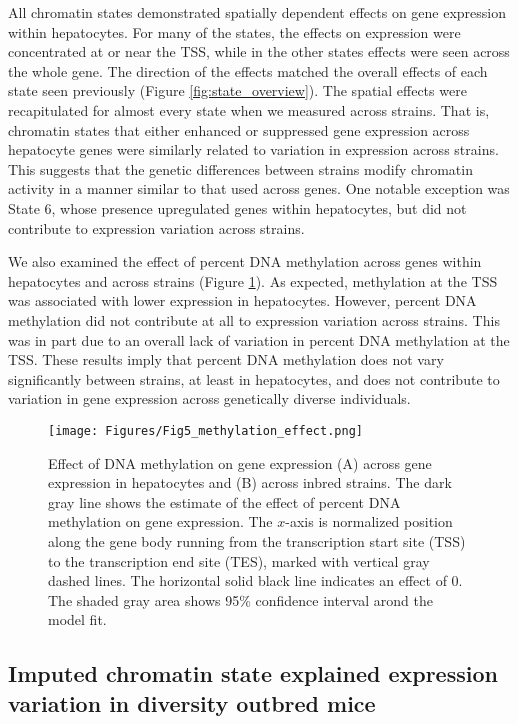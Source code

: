 \documentclass[
  11pt,
]{article}
\begin{document}
All chromatin states demonstrated spatially dependent effects on gene
expression within hepatocytes. For many of the states, the effects on
expression were concentrated at or near the TSS, while in the other
states effects were seen across the whole gene. The direction of the
effects matched the overall effects of each state seen previously
(Figure \ref{fig:state_overview}). The spatial effects were
recapitulated for almost every state when we measured across strains.
That is, chromatin states that either enhanced or suppressed gene
expression across hepatocyte genes were similarly related to variation
in expression across strains. This suggests that the genetic differences
between strains modify chromatin activity in a manner similar to that
used across genes. One notable exception was State 6, whose presence
upregulated genes within hepatocytes, but did not contribute to
expression variation across strains.

We also examined the effect of percent DNA methylation across genes
within hepatocytes and across strains (Figure
\ref{fig:DNA_methylation_effect}). As expected, methylation at the TSS
was associated with lower expression in hepatocytes. However, percent
DNA methylation did not contribute at all to expression variation across
strains. This was in part due to an overall lack of variation in percent
DNA methylation at the TSS. These results imply that percent DNA
methylation does not vary significantly between strains, at least in
hepatocytes, and does not contribute to variation in gene expression
across genetically diverse individuals.

\begin{figure}[ht!]
\texttt{[image: Figures/Fig5\_methylation\_effect.png]} 
\caption{Effect of DNA methylation on gene expression (A) across gene expression
in hepatocytes and (B) across inbred strains. The dark gray line shows the
estimate of the effect of percent DNA methylation on gene expression. The 
$x$-axis is normalized position along the gene body running from the 
transcription start site (TSS) to the transcription end site (TES), 
marked with vertical gray dashed lines. The horizontal solid black 
line indicates an effect of 0. The shaded gray area shows 95\% 
confidence interval arond the model fit.}
\label{fig:DNA_methylation_effect}
\end{figure}

\hypertarget{imputed-chromatin-state-explained-expression-variation-in-diversity-outbred-mice}{%
\subsection{Imputed chromatin state explained expression variation in
diversity outbred
mice}\label{imputed-chromatin-state-explained-expression-variation-in-diversity-outbred-mice}}
\end{document}
